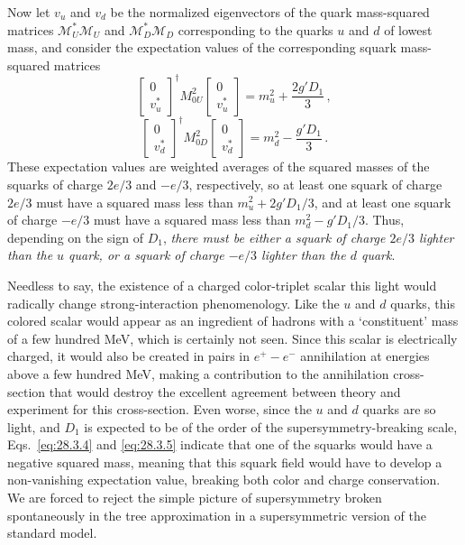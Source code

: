 Now let \(v_u\) and \(v_d\) be the normalized eigenvectors of the quark
mass-squared matrices \(\mathcal{M}_U^*\mathcal{M}_U\) and
\(\mathcal{M}_D^*\mathcal{M}_D\) corresponding to the quarks \(u\) and
\(d\) of lowest mass, and consider the expectation values of the
corresponding squark mass-squared matrices
\begin{equation}
  \begin{bmatrix}0\\v_u^*\end{bmatrix}^{\!\dagger}
  M_{0U}^2
  \begin{bmatrix}0\\v_u^*\end{bmatrix}
  =m_u^2+\frac{2g'D_1}{3}\,,
  \tag{28.3.4}\label{eq:28.3.4}
\end{equation}
\begin{equation}
  \begin{bmatrix}0\\v_d^*\end{bmatrix}^{\!\dagger}
  M_{0D}^2
  \begin{bmatrix}0\\v_d^*\end{bmatrix}
  =m_d^2-\frac{g'D_1}{3}\,.
  \tag{28.3.5}\label{eq:28.3.5}
\end{equation}
These expectation values are weighted averages of the squared masses of the
squarks of charge \(2e/3\) and \(-e/3\), respectively, so at least one
squark of charge \(2e/3\) must have a squared mass less than
\(m_u^2+2g'D_1/3\), and at least one squark of charge \(-e/3\) must have a
squared mass less than \(m_d^2-g'D_1/3\). Thus, depending on the sign of
\(D_1\), \emph{there must be either a squark of charge \(2e/3\) lighter
than the \(u\) quark, or a squark of charge \(-e/3\) lighter than the
\(d\) quark}.

Needless to say, the existence of a charged color-triplet scalar this light
would radically change strong-interaction phenomenology. Like the \(u\) and
\(d\) quarks, this colored scalar would appear as an ingredient of hadrons
with a `constituent' mass of a few hundred MeV, which is certainly not seen.
Since this scalar is electrically charged, it would also be created in pairs
in \(e^+-e^-\) annihilation at energies above a few hundred MeV, making
a contribution to the annihilation cross-section that would destroy the
excellent agreement between theory and experiment for this cross-section.
Even worse, since the \(u\) and \(d\) quarks are so light, and \(D_1\) is
expected to be of the order of the supersymmetry-breaking scale,
Eqs.~\eqref{eq:28.3.4} and \eqref{eq:28.3.5} indicate that one of the
squarks would have a negative squared mass, meaning that this squark field
would have to develop a non-vanishing expectation value, breaking both
color and charge conservation. We are forced to reject the simple picture
of supersymmetry broken spontaneously in the tree approximation in a
supersymmetric version of the standard model.

